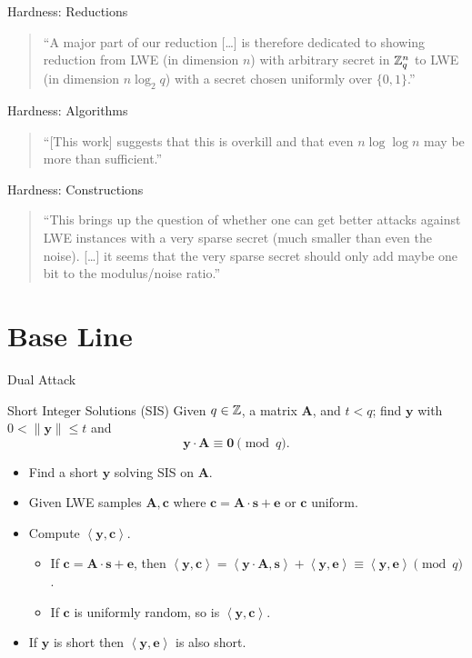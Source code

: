 \documentclass[presentation,smaller]{beamer}
\newcommand{\ZZ}[1][blank]{\ensuremath{\ifthenelse{\equal{#1}{blank}}{\mathbb{Z}}{\mathbb{Z}\left[#1\right]}\xspace}}
\newcommand{\ZZq}[1][blank]{\ensuremath{\ifthenelse{\equal{#1}{blank}}{\mathbb{Z}_q}{\mathbb{Z}_q\left[#1\right]}\xspace}}
\renewcommand{\vec}[1]{\ensuremath{\mathbf{#1}}\xspace}
\newcommand{\ip}[2]{\ensuremath{\left\langle {#1},{#2}\right\rangle}\xspace}
\begin{document}
\begin{frame}[label={sec:orgheadline8}]{Hardness: Reductions}
\begin{quote}
“A major part of our reduction [\dots{}] is therefore dedicated to showing  reduction from LWE (in dimension \(n\)) with arbitrary secret in \(\ZZq^n\) to LWE (in dimension \alert{\(n \log_2 q\)}) with a secret chosen uniformly over \(\{0, 1\}\).” 
\end{quote}
\end{frame}

\begin{frame}[label={sec:orgheadline9}]{Hardness: Algorithms}
\begin{quote}
“[This work] suggests that this is overkill and that even \alert{\(n\log\log n\)} may be more than sufficient.”
\end{quote}
\end{frame}

\begin{frame}[label={sec:orgheadline10}]{Hardness: Constructions}
\begin{quote}
“This brings up the question of whether one can get better attacks against LWE instances with a very sparse secret (much smaller than even the noise). [\dots{}] it seems that the very sparse secret should only add maybe \alert{one bit to the modulus/noise ratio}.” 
\end{quote}
\end{frame}

\section{Base Line}
\label{sec:orgheadline25}
\begin{frame}[label={sec:orgheadline12}]{Dual Attack}
\begin{block}{Short Integer Solutions (SIS)}
Given \(q \in \ZZ\), a matrix \(\vec{A}\), and \(t < q\); find \(\vec{y}\) with \(0 < \| \vec{y} \| \leq t\) and \[\vec{y} ⋅ \vec{A} ≡ \vec{0} \pmod{q}.\]
\end{block}

\begin{itemize}
\item Find a short \(\vec{y}\) solving SIS on \(\vec{A}\).
\item Given LWE samples \(\vec{A}, \vec{c}\) where \(\vec{c} = \vec{A}⋅\vec{s} + \vec{e}\) or \(\vec{c}\) uniform.
\item Compute \(\ip{\vec{y}}{\vec{c}}\).
\begin{itemize}
\item If \(\vec{c} = \vec{A}⋅\vec{s} + \vec{e}\), then \(\ip{\vec{y}}{\vec{c}} = \ip{\vec{y}⋅\vec{A}}{\vec{s}} + \ip{\vec{y}}{\vec{e}} \equiv \ip{\vec{y}}{\vec{e}} \pmod{q}\).
\item If \(\vec{c}\) is uniformly random, so is \(\ip{\vec{y}}{\vec{c}}\).
\end{itemize}
\item If \(\vec{y}\) is short then \(\ip{\vec{y}}{\vec{e}}\) is also short.
\end{itemize}
\end{frame}
\end{document}
